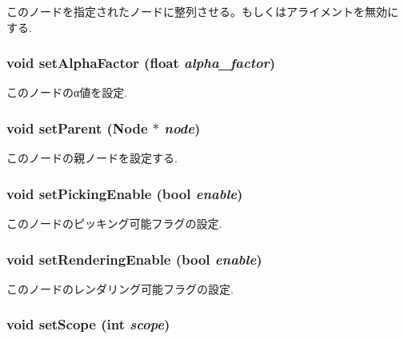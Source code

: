このノードを指定されたノードに整列させる。もしくはアライメントを無効にする. \hypertarget{classm3g_1_1Node_b33c321ce240770e5eb64d0e20ea61cc}{
\subsubsection[{setAlphaFactor}]{\setlength{\rightskip}{0pt plus 5cm}void setAlphaFactor (float {\em alpha\_\-factor})}}
\label{classm3g_1_1Node_b33c321ce240770e5eb64d0e20ea61cc}


このノードのα値を設定. \hypertarget{classm3g_1_1Node_880ecc7c1c091f7607eeae12ed100a9a}{
\subsubsection[{setParent}]{\setlength{\rightskip}{0pt plus 5cm}void setParent ({\bf Node} $\ast$ {\em node})}}
\label{classm3g_1_1Node_880ecc7c1c091f7607eeae12ed100a9a}


このノードの親ノードを設定する. \hypertarget{classm3g_1_1Node_4f9296202713ac56ccae72d5e0c21d96}{
\subsubsection[{setPickingEnable}]{\setlength{\rightskip}{0pt plus 5cm}void setPickingEnable (bool {\em enable})}}
\label{classm3g_1_1Node_4f9296202713ac56ccae72d5e0c21d96}


このノードのピッキング可能フラグの設定. \hypertarget{classm3g_1_1Node_58981ef7aea1bf0e630bcc065b2987e9}{
\subsubsection[{setRenderingEnable}]{\setlength{\rightskip}{0pt plus 5cm}void setRenderingEnable (bool {\em enable})}}
\label{classm3g_1_1Node_58981ef7aea1bf0e630bcc065b2987e9}


このノードのレンダリング可能フラグの設定. \hypertarget{classm3g_1_1Node_55f324f307a01705b9094a73af4ecd68}{
\subsubsection[{setScope}]{\setlength{\rightskip}{0pt plus 5cm}void setScope (int {\em scope})}}
\label{classm3g_1_1Node_55f324f307a01705b9094a73af4ecd68}


